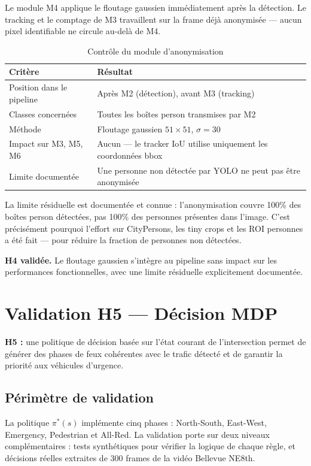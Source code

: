 Le module M4 applique le floutage gaussien
immédiatement après la détection. Le
tracking et le comptage de M3 travaillent
sur la frame déjà anonymisée — aucun pixel
identifiable ne circule au-delà de M4.

\begin{table}[H]
\centering
\caption{Contrôle du module d'anonymisation}
\begin{tabularx}{\textwidth}{lX}
\toprule
\textbf{Critère} &
\textbf{Résultat} \\
\midrule
Position dans le pipeline &
Après M2 (détection),
avant M3 (tracking) \\
Classes concernées &
Toutes les boîtes person
transmises par M2 \\
Méthode &
Floutage gaussien
$51\times51$, $\sigma=30$ \\
Impact sur M3, M5, M6 &
Aucun — le tracker IoU utilise
uniquement les coordonnées bbox \\
Limite documentée &
Une personne non détectée
par YOLO ne peut pas être
anonymisée \\
\bottomrule
\end{tabularx}
\label{tab:anonymisation_control}
\end{table}

La limite résiduelle est documentée et
connue : l'anonymisation couvre 100\%
des boîtes person détectées, pas 100\%
des personnes présentes dans l'image.
C'est précisément pourquoi l'effort
sur CityPersons, les tiny crops et les
ROI personnes a été fait — pour réduire
la fraction de personnes non détectées.

\textbf{H4 validée.} Le floutage gaussien
s'intègre au pipeline sans impact sur
les performances fonctionnelles, avec
une limite résiduelle explicitement
documentée.

\section{Validation H5 — Décision MDP}

\textbf{H5 :} une politique de décision
basée sur l'état courant de l'intersection
permet de générer des phases de feux
cohérentes avec le trafic détecté et
de garantir la priorité aux véhicules
d'urgence.

\subsection{Périmètre de validation}

La politique $\pi^*(s)$ implémente
cinq phases : North-South, East-West,
Emergency, Pedestrian et All-Red.
La validation porte sur deux niveaux
complémentaires : tests synthétiques
pour vérifier la logique de chaque
règle, et décisions réelles extraites
de 300 frames de la vidéo Bellevue NE8th.


